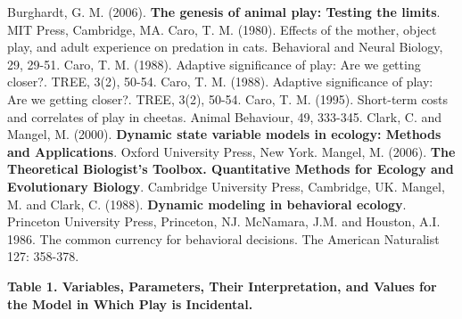 \documentclass[12pt, letterpaper, fleqn]{article}
\begin{document}
% 
% 
% 
% 
\singlespacing
\begin{thebibliography}{2}
%
 Burghardt, G. M. (2006). \textbf{The genesis of animal play: Testing the limits}. MIT Press, Cambridge, MA.
%
 Caro, T. M. (1980). Effects of the mother, object play, and adult experience on predation in cats. Behavioral and Neural Biology, 29, 29-51.
%
 Caro, T. M. (1988). Adaptive significance of play: Are we getting closer?. TREE, 3(2), 50-54.
%
 Caro, T. M. (1988). Adaptive significance of play: Are we getting closer?. TREE, 3(2), 50-54.
%
 Caro, T. M. (1995). Short-term costs and correlates of play in cheetas. Animal Behaviour, 49, 333-345.
%
 Clark, C. and Mangel, M. (2000).  \textbf{Dynamic state variable models in ecology: Methods and Applications}. Oxford University Press, New York.
%
 Mangel, M. (2006). \textbf{The Theoretical Biologist's Toolbox. Quantitative Methods for Ecology and Evolutionary Biology}. Cambridge University Press, Cambridge, UK.
%
 Mangel, M. and Clark, C. (1988).  \textbf{Dynamic modeling in behavioral ecology}. Princeton University Press, Princeton, NJ.
%
 McNamara, J.M. and Houston, A.I. 1986. The common currency for behavioral decisions. The American Naturalist 127: 358-378.
\end{thebibliography}
\doublespacing






%
\clearpage 
\hspace*{-2cm}
\noindent
\textbf{Table 1. Variables, Parameters, Their Interpretation, and Values for the Model in Which Play is Incidental.}
%
\end{document}
